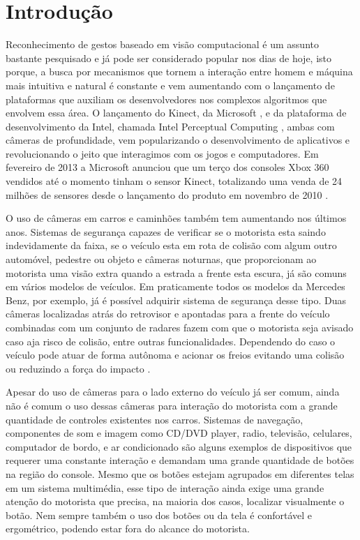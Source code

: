 \chapter{Introdução}

Reconhecimento de gestos baseado em visão computacional é um assunto bastante pesquisado e já pode ser considerado popular nos dias de hoje, isto porque, a busca por mecanismos que tornem a interação entre homem e máquina mais intuitiva e natural é constante e vem aumentando com o lançamento de plataformas que auxiliam os desenvolvedores nos complexos algoritmos que envolvem essa área.
O lançamento do Kinect, da Microsoft \cite{kinect}, e da plataforma de desenvolvimento da Intel, chamada Intel Perceptual Computing \cite{intel},  ambas com câmeras de profundidade, vem popularizando o desenvolvimento de aplicativos e revolucionando o jeito que interagimos com os jogos e computadores. Em fevereiro de 2013 a Microsoft anunciou que um terço dos consoles Xbox 360 vendidos até o momento tinham o sensor Kinect, totalizando  uma venda de 24 milhões de sensores desde o lançamento do produto em novembro de 2010 \cite{kinect_sales}.

O uso de câmeras em carros e caminhões também tem aumentando nos últimos anos. Sistemas de segurança capazes de verificar se o motorista esta saindo indevidamente da faixa, se o veículo esta em rota de colisão com algum outro automóvel, pedestre ou objeto e câmeras noturnas, que proporcionam ao motorista uma visão extra quando a  estrada a frente esta escura, já são comuns em vários modelos de veículos. Em praticamente todos os modelos da Mercedes Benz, por exemplo, já é possível adquirir sistema de segurança desse tipo. Duas câmeras localizadas atrás do retrovisor e apontadas para a frente do veículo combinadas com um conjunto de radares fazem com que o motorista seja avisado caso aja risco de colisão, entre outras funcionalidades. Dependendo do caso o veículo pode atuar de forma autônoma e acionar os freios evitando uma colisão ou reduzindo a força do impacto \cite{mercedes_youtube, mercedes_safety}. 

Apesar do uso de câmeras para o lado externo do veículo já ser comum, ainda não é comum o uso dessas câmeras para interação do motorista com a grande quantidade de controles existentes nos carros. Sistemas de navegação, componentes de som e imagem como CD/DVD player, radio, televisão, celulares, computador de bordo, e ar condicionado são alguns exemplos de dispositivos que requerer uma constante interação e demandam uma grande quantidade de botões na região do console. Mesmo que os botões estejam agrupados em diferentes telas em um sistema multimédia, esse tipo de interação ainda exige uma grande atenção do motorista que precisa, na maioria dos casos, localizar visualmente o botão. Nem sempre também o uso dos botões ou da tela é confortável e ergométrico, podendo estar fora do alcance do motorista.

